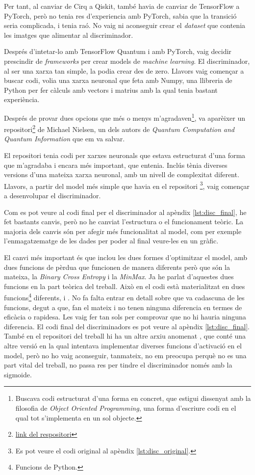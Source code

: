 Per tant, al canviar de Cirq a Qiskit, també havia de canviar de TensorFlow a PyTorch, però no tenia res d'experiencia amb PyTorch, sabia que la transició seria complicada, i tenia raó. No vaig ni aconseguir crear el \textit{dataset} que contenia les imatges que alimentar al discriminador. 

Després d'intetar-lo amb TensorFlow Quantum i amb PyTorch, vaig decidir prescindir de \textit{frameworks} per crear models de \textit{machine learning}. El discriminador, al ser una xarxa tan simple, la podia crear des de zero. Llavors vaig començar a buscar codi, volia una xarxa neuronal que feta amb Numpy, una llibreria de Python per fer càlculs amb vectors i matrius amb la qual tenia bastant experiència. 

Després de provar dues opcions que més o menys m'agradaven\footnote{Buscava codi estructurat d'una forma en concret, que estigui dissenyat amb la filosofia de \textit{Object Oriented Programming}, una forma d'escriure codi en el qual tot s'implementa en un sol objecte.}, va aparèixer un repositori\footnote{\href{https://github.com/mnielsen/neural-networks-and-deep-learning}{link del respositori}} de Michael Nielsen, un dels autors de \textit{Quantum Computation and Quantum Information} \cite{QCandQI} que em va salvar. 

El repositori tenia codi per xarxes neuronals que estava estructurat d'una forma que m'agradaba i encara més important, que entenia. Inclús tènia diverses versions d'una mateixa xarxa neuronal, amb un nivell de complexitat diferent. Llavors, a partir del model més simple que havia en el repositori \footnote{Es pot veure el codi original al apèndix \ref{lst:disc_original}.}, vaig començar a desenvolupar el discriminador. 

Com es pot veure al codi final per el discriminador al apèndix \ref{lst:disc_final}, he fet bastants canvis, però no he canviat l'estructura o el funcionament teòric. La majoria dels canvis són per afegir més funcionalitat al model, com per exemple l'enmagatzematge de les dades per poder al final veure-les en un gràfic. 

El canvi més important és que inclou les dues formes d'optimitzar el model, amb dues funcions de pèrdua que funcionen de manera diferents però que són la mateixa, la \textit{Binary Cross Entropy} i la \textit{MinMax}. Ja he parlat d'aquestes dues funcions en la part teòrica del treball. Això en el codi està materialitzat en dues funcions\footnote{Funcions de Python.} diferents,  i . No fa falta entrar en detall sobre que va cadascuna de les funcions, degut a que, fan el mateix i no tenen ninguna diferencia en termes de eficàcia o rapidesa. Les vaig fer tan sols per comprovar que no hi hauria ninguna diferencia. El codi final del discriminadors es pot veure al apèndix \ref{lst:disc_final}. També en el repositori del treball hi ha un altre arxiu anomenat , que conté una altre versió en la qual intentava implementar diverses funcions d'activació en el model, però no ho vaig aconseguir, tanmateix, no em preocupa perquè no es una part vital del treball, no passa res per tindre el discriminador només amb la sigmoide. 

